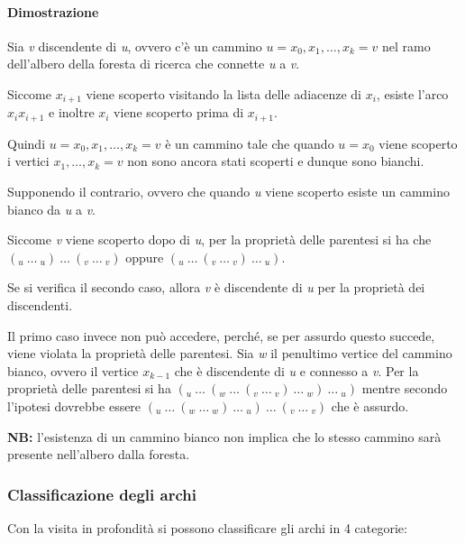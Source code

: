\paragraph{Dimostrazione}\label{dimostrazione-2}

Sia \emph{v} discendente di \emph{u}, ovvero c'è un cammino $u = x_0, x_1, \ldots, x_k = v$ nel ramo dell'albero della foresta di ricerca
che connette \emph{u} a \emph{v}.

Siccome $x_{i+1}$ viene scoperto visitando la lista delle adiacenze di
$x_i$, esiste l'arco $x_ix_{i+1}$ e inoltre $x_i$ viene
scoperto prima di $x_{i+1}$.

Quindi $u = x_0, x_1,\ldots,x_k = v$ è un cammino tale che quando
$u = x_0$ viene scoperto i vertici $x_1,\ldots,x_k = v$ non
sono ancora stati scoperti e dunque sono bianchi.

Supponendo il contrario, ovvero che quando \emph{u} viene scoperto
esiste un cammino bianco da \emph{u} a \emph{v}.

Siccome \emph{v} viene scoperto dopo di \emph{u}, per la proprietà delle
parentesi si ha che  $(_u \: \ldots\: _u) \: \ldots \: (_v \:\ldots \:_v)$ oppure
$(_u \: \ldots \: (_v \: \ldots \:_v) \: \ldots \:_u)$.

Se si verifica il secondo caso, allora \emph{v} è discendente di
\emph{u} per la proprietà dei discendenti.

Il primo caso invece non può accedere, perché, se per assurdo questo
succede, viene violata la proprietà delle parentesi. 
Sia \emph{w} il penultimo vertice del cammino bianco, ovvero il vertice $x_{k-1}$ che
è discendente di \emph{u} e connesso a \emph{v}. Per la proprietà delle
parentesi si ha $(_u \: \ldots \: (_w \: \ldots \: (_v \: \ldots\: _v) \: \ldots \: _w) \: \ldots \: _u)$ mentre secondo l'ipotesi dovrebbe essere 
$(_u \: \ldots \: (_w \: \ldots \: _w) \: \ldots \: _u) \: \ldots \: (_v \: \ldots\: _v)$ che è
assurdo.

\textbf{NB:} l'esistenza di un cammino bianco non implica che lo stesso
cammino sarà presente nell'albero dalla foresta.

\subsubsection{Classificazione degli archi}\label{classificazione-degli-archi}

Con la visita in profondità si possono classificare gli archi in 4
categorie:

